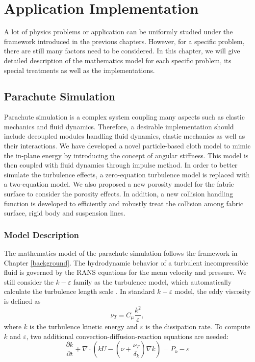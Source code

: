 \chapter{Application Implementation}
A lot of physics problems or application can be uniformly studied under the framework introduced in the previous chapters. However, for a specific problem, there are still many factors need to be considered. In this chapter, we will give detailed description of the mathematics model for each specific problem, its special treatments as well as the implementations.
\section{Parachute Simulation}
Parachute simulation is a complex system coupling many aspects such as 
elastic mechanics and fluid dynamics. Therefore, a desirable implementation should include decoupled modules handling fluid dynamics, elastic mechanics as well as their interactions. We have developed a novel particle-based cloth model to mimic the in-plane energy by introducing the concept of angular stiffness. This model is then coupled with fluid dynamics through impulse method. In order to better simulate the turbulence effects, a zero-equation turbulence model is replaced with a two-equation model. We also proposed a new 
porosity model for the fabric surface to consider the porosity effects. 
In addition, a new collision handling function is developed to efficiently and 
robustly treat the collision among fabric surface, rigid body and suspension lines.

\subsection{Model Description}
The mathematics model of the parachute simulation follows the framework in Chapter \ref{background}. The hydrodynamic behavior of a turbulent incompressible fluid is governed by the RANS equations for the mean velocity and pressure. We still consider the $k-\varepsilon$ family as the turbulence model, which automatically
calculate the turbulence length scale \cite{wilcox1998turbulence}.  In standard
$k-\varepsilon$ model, the eddy viscosity is defined as 
\begin{equation} \nu_T =
C_{\mu}\frac{k^2}{\varepsilon}, \label{eq:nuT} 
\end{equation} 
where $k$ is the turbulence kinetic energy and $\varepsilon$ is the dissipation rate. To compute $k$ and $\varepsilon$, two additional convection-diffusion-reaction equations
are needed: 
\begin{equation} 
\frac{\partial k}{\partial
t}+\nabla\cdot(kU-(\nu+\frac{\nu_T}{\delta_k})\nabla k) =P_k - \varepsilon
\label{eq:k} 
\end{equation} 

